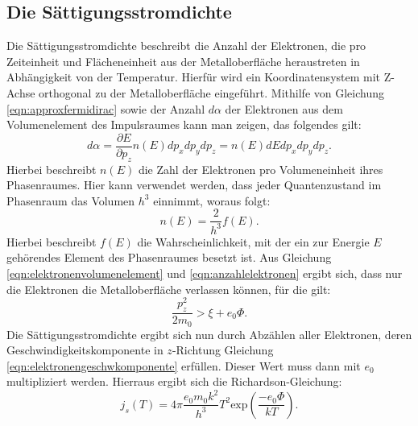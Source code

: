 \subsection{Die Sättigungsstromdichte}
\label{sec:sättstromd}
Die Sättigungsstromdichte beschreibt die Anzahl der Elektronen, die pro Zeiteinheit
und Flächeneinheit aus der Metalloberfläche heraustreten in Abhängigkeit von
der Temperatur. Hierfür wird ein Koordinatensystem mit Z-Achse orthogonal zu der
Metalloberfläche eingeführt. Mithilfe von Gleichung \eqref{eqn:approxfermidirac}
sowie der Anzahl $d\alpha$ der Elektronen aus dem Volumenelement des Impulsraumes
kann man zeigen, das folgendes gilt:
\begin{equation}
    d\alpha = \frac{\partial E}{\partial p_z} n(E) dp_x dp_y
    dp_z = n(E) dE dp_x dp_y dp_z.
    \label{eqn:elektronenvolumenelement}
\end{equation}
Hierbei beschreibt $n(E)$ die Zahl der Elektronen pro Volumeneinheit ihres
Phasenraumes. Hier kann verwendet werden, dass jeder Quantenzustand im Phasenraum
das Volumen $h^3$ einnimmt, woraus folgt:
\begin{equation}
    n(E) = \frac{2}{h^3}f(E).
    \label{eqn:anzahlelektronen}
\end{equation}
Hierbei beschreibt $f(E)$ die Wahrscheinlichkeit, mit der ein zur Energie $E$
gehörendes Element des Phasenraumes besetzt ist.
Aus Gleichung \eqref{eqn:elektronenvolumenelement} und \eqref{eqn:anzahlelektronen}
ergibt sich, dass nur die Elektronen die Metalloberfläche verlassen können, für
die gilt:
\begin{equation}
    \frac{p_z^2}{2 m_0} > \xi + e_0 \Phi.
    \label{eqn:elektronengeschwkomponente}
\end{equation}
Die Sättigungsstromdichte ergibt sich nun durch Abzählen aller Elektronen,
deren Geschwindigkeitskomponente in $z$-Richtung Gleichung
\eqref{eqn:elektronengeschwkomponente} erfüllen. Dieser Wert muss dann mit $e_0$
multipliziert werden. Hierraus ergibt sich die Richardson-Gleichung:
\begin{equation}
    j_s(T) = 4 \pi \frac{e_0 m_0 k^2}{h^3}T^2 \text{exp}\left(\frac{-e_0 \Phi}{k T}\right).
    \label{eqn:richardson}
\end{equation}

